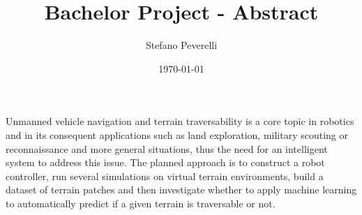 \documentclass{article}[12pt]
\begin{document}
\title{Bachelor Project - Abstract}
\author{Stefano Peverelli}
\date{\today}
Unmanned vehicle navigation and terrain traversability is a core topic in robotics
and in its consequent applications such as land exploration, military scouting or
reconnaissance and more general situations, thus the need for an intelligent system
to address this issue. The planned approach is to construct a robot controller,
run several simulations on virtual terrain environments, build a dataset of terrain
patches and then investigate whether to apply machine learning to automatically predict
if a given terrain is traversable or not.
\end{document}
